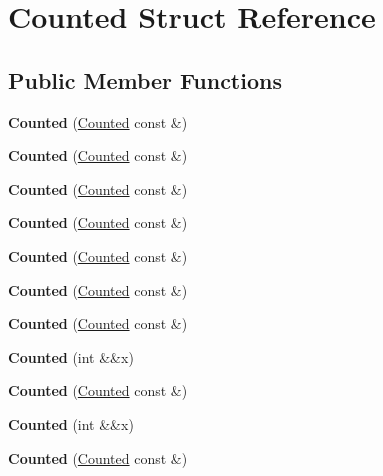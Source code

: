 \hypertarget{struct_counted}{}\section{Counted Struct Reference}
\label{struct_counted}
\subsection*{Public Member Functions}
\begin{DoxyCompactItemize}
\item 
\mbox{\label{struct_counted_a06ee19b485352cff5caf69b36acb4cab}} 
{\bfseries Counted} (\mbox{\hyperlink{struct_counted}{Counted}} const \&)
\item 
\mbox{\label{struct_counted_a06ee19b485352cff5caf69b36acb4cab}} 
{\bfseries Counted} (\mbox{\hyperlink{struct_counted}{Counted}} const \&)
\item 
\mbox{\label{struct_counted_a06ee19b485352cff5caf69b36acb4cab}} 
{\bfseries Counted} (\mbox{\hyperlink{struct_counted}{Counted}} const \&)
\item 
\mbox{\label{struct_counted_a06ee19b485352cff5caf69b36acb4cab}} 
{\bfseries Counted} (\mbox{\hyperlink{struct_counted}{Counted}} const \&)
\item 
\mbox{\label{struct_counted_a06ee19b485352cff5caf69b36acb4cab}} 
{\bfseries Counted} (\mbox{\hyperlink{struct_counted}{Counted}} const \&)
\item 
\mbox{\label{struct_counted_a06ee19b485352cff5caf69b36acb4cab}} 
{\bfseries Counted} (\mbox{\hyperlink{struct_counted}{Counted}} const \&)
\item 
\mbox{\label{struct_counted_a06ee19b485352cff5caf69b36acb4cab}} 
{\bfseries Counted} (\mbox{\hyperlink{struct_counted}{Counted}} const \&)
\item 
\mbox{\label{struct_counted_a713f0547779ed57d7193becb3140d2db}} 
{\bfseries Counted} (int \&\&x)
\item 
\mbox{\label{struct_counted_a06ee19b485352cff5caf69b36acb4cab}} 
{\bfseries Counted} (\mbox{\hyperlink{struct_counted}{Counted}} const \&)
\item 
\mbox{\label{struct_counted_a713f0547779ed57d7193becb3140d2db}} 
{\bfseries Counted} (int \&\&x)
\item 
\mbox{\label{struct_counted_a06ee19b485352cff5caf69b36acb4cab}} 
{\bfseries Counted} (\mbox{\hyperlink{struct_counted}{Counted}} const \&)
\end{DoxyCompactItemize}
